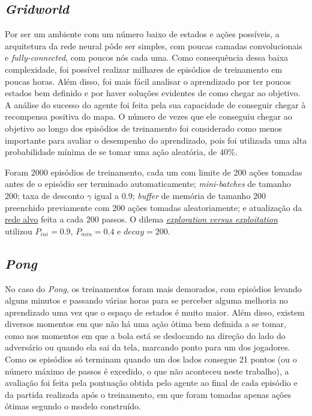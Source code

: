 \subsection{\textit{Gridworld}}
\label{sec:exp_gridworld}

Por ser um ambiente com um número baixo de estados e ações possíveis, a arquitetura da rede neural pôde ser simples, com poucas camadas convolucionais e \textit{fully-connected}, com poucos nós cada uma.
Como consequência dessa baixa complexidade, foi possível realizar milhares de episódios de treinamento em poucas horas.
Além disso, foi mais fácil analisar o aprendizado por ter poucos estados bem definido e por haver soluções evidentes de como chegar ao objetivo.
A análise do sucesso do agente foi feita pela sua capacidade de conseguir chegar à recompensa positiva do mapa.
O número de vezes que ele conseguiu chegar ao objetivo ao longo dos episódios de treinamento foi considerado como menos importante para avaliar o desempenho do aprendizado, pois foi utilizada uma alta probabilidade mínima de se tomar uma ação aleatória, de 40\%.


Foram 2000 episódios de treinamento, cada um com limite de 200 ações tomadas antes de o episódio ser terminado automaticamente;
\textit{mini-batches} de tamanho 200;
taxa de desconto $\gamma$ igual a $0.9$; 
\textit{buffer} de memória de tamanho 200 preenchido previamente com 200 ações tomadas aleatoriamente;
e atualização da \hyperref[sec:ft]{rede alvo} feita a cada 200 passos.
O dilema \hyperref[eq:exp_exp_prob]{\textit{exploration versus exploitation}} utilizou $P_{ini} = 0.9$, $P_{min} = 0.4$ e $decay = 200$.

\subsection{\textit{Pong}}
\label{sec:exp_pong}

No caso do \textit{Pong}, os treinamentos foram mais demorados, com episódios levando alguns minutos e passando várias horas para se perceber alguma melhoria no aprendizado uma vez que o espaço de estados é muito maior.
Além disso, existem diversos momentos em que não há uma ação ótima bem definida a se tomar, como nos momentos em que a bola está se deslocando na direção do lado do adversário ou quando ela sai da tela, marcando ponto para um dos jogadores.
Como os episódios só terminam quando um dos lados consegue 21 pontos (ou o número máximo de passos é excedido, o que não aconteceu neste trabalho), a avaliação foi feita pela pontuação obtida pelo agente ao final de cada episódio e da partida realizada após o treinamento, em que foram tomadas apenas ações ótimas segundo o modelo construído.

